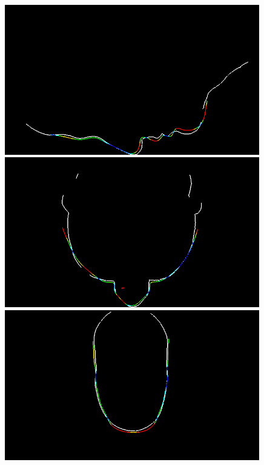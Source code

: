 \begin{figure}
  \begin{minipage}{.325\textwidth}
    \centering
    \includegraphics[width=0.99\textwidth]{Figures/eval/our/1/x-gt.png}
  \end{minipage}
  \begin{minipage}{.325\textwidth}
    \centering
    \includegraphics[width=0.99\textwidth]{Figures/eval/our/1/y-gt.png}
  \end{minipage}
  \begin{minipage}{.325\textwidth}
    \centering
    \includegraphics[width=0.99\textwidth]{Figures/eval/our/1/z-gt.png}
  \end{minipage}


\end{figure}

